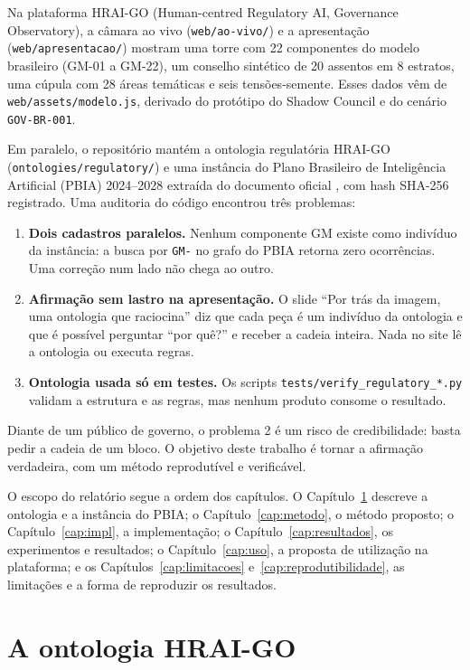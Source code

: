 \documentclass[12pt,a4paper,oneside,english,brazil]{abntex2}
\begin{document}
Na plataforma HRAI-GO (Human-centred Regulatory AI, Governance Observatory), a câmara ao vivo (\texttt{web/ao-vivo/}) e a apresentação (\texttt{web/apresentacao/}) mostram uma torre com 22 componentes do modelo brasileiro (GM-01 a GM-22), um conselho sintético de 20 assentos em 8 estratos, uma cúpula com 28 áreas temáticas e seis tensões-semente. Esses dados vêm de \texttt{web/assets/modelo.js}, derivado do protótipo do Shadow Council e do cenário \texttt{GOV-BR-001}.

Em paralelo, o repositório mantém a ontologia regulatória HRAI-GO (\texttt{ontologies/\allowbreak regulatory/}) e uma instância do Plano Brasileiro de Inteligência Artificial (PBIA) 2024--2028 extraída do documento oficial \cite{pbia2025}, com hash SHA-256 registrado. Uma auditoria do código encontrou três problemas:

\begin{enumerate}[leftmargin=*]
  \item \textbf{Dois cadastros paralelos.} Nenhum componente GM existe como indivíduo da instância: a busca por \texttt{GM-} no grafo do PBIA retorna zero ocorrências. Uma correção num lado não chega ao outro.
  \item \textbf{Afirmação sem lastro na apresentação.} O slide ``Por trás da imagem, uma ontologia que raciocina'' diz que cada peça é um indivíduo da ontologia e que é possível perguntar ``por quê?'' e receber a cadeia inteira. Nada no site lê a ontologia ou executa regras.
  \item \textbf{Ontologia usada só em testes.} Os scripts \texttt{tests/verify\_regulatory\_*.py} validam a estrutura e as regras, mas nenhum produto consome o resultado.
\end{enumerate}

\noindent Diante de um público de governo, o problema 2 é um risco de credibilidade: basta pedir a cadeia de um bloco. O objetivo deste trabalho é tornar a afirmação verdadeira, com um método reprodutível e verificável.

O escopo do relatório segue a ordem dos capítulos. O Capítulo~\ref{cap:ontologia} descreve a ontologia e a instância do PBIA; o Capítulo~\ref{cap:metodo}, o método proposto; o Capítulo~\ref{cap:impl}, a implementação; o Capítulo~\ref{cap:resultados}, os experimentos e resultados; o Capítulo~\ref{cap:uso}, a proposta de utilização na plataforma; e os Capítulos~\ref{cap:limitacoes} e~\ref{cap:reprodutibilidade}, as limitações e a forma de reproduzir os resultados.

\chapter{A ontologia HRAI-GO}\label{cap:ontologia}
\end{document}
